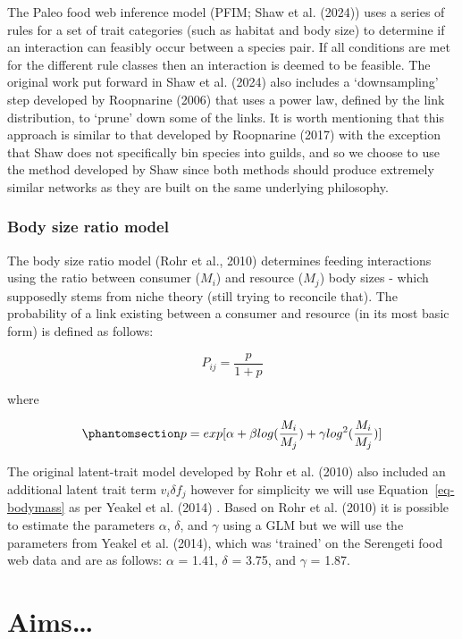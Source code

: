 \documentclass[
]{article}
\begin{document}
The Paleo food web inference model (PFIM; Shaw et al. (2024)) uses a
series of rules for a set of trait categories (such as habitat and body
size) to determine if an interaction can feasibly occur between a
species pair. If all conditions are met for the different rule classes
then an interaction is deemed to be feasible. The original work put
forward in Shaw et al. (2024) also includes a `downsampling' step
developed by Roopnarine (2006) that uses a power law, defined by the
link distribution, to `prune' down some of the links. It is worth
mentioning that this approach is similar to that developed by Roopnarine
(2017) with the exception that Shaw does not specifically bin species
into guilds, and so we choose to use the method developed by Shaw since
both methods should produce extremely similar networks as they are built
on the same underlying philosophy.

\subsubsection{Body size ratio model}\label{body-size-ratio-model}

The body size ratio model (Rohr et al., 2010) determines feeding
interactions using the ratio between consumer (\(M_{i}\)) and resource
(\(M_{j}\)) body sizes - which supposedly stems from niche theory (still
trying to reconcile that). The probability of a link existing between a
consumer and resource (in its most basic form) is defined as follows:

\[
P_{ij} = \frac{p}{1+p}
\]

where

\begin{equation}\phantomsection\label{eq-bodymass}{
p = exp[\alpha + \beta log(\frac{M_{i}}{M_{j}}) + \gamma log^{2}(\frac{M_{i}}{M_{j}})]
}\end{equation}

The original latent-trait model developed by Rohr et al. (2010) also
included an additional latent trait term \(v_{i} \delta f_{j}\) however
for simplicity we will use Equation~\ref{eq-bodymass} as per Yeakel et
al. (2014) . Based on Rohr et al. (2010) it is possible to estimate the
parameters \(\alpha\), \(\delta\), and \(\gamma\) using a GLM but we
will use the parameters from Yeakel et al. (2014), which was `trained'
on the Serengeti food web data and are as follows: \(\alpha\) = 1.41,
\(\delta\) = 3.75, and \(\gamma\) = 1.87.

\section{Aims\ldots{}}\label{aims}
\end{document}

